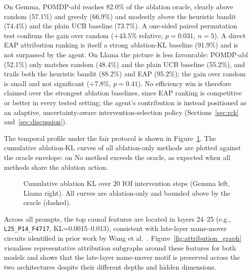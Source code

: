On Gemma, POMDP-abl reaches 82.0\% of the ablation oracle, clearly
above random (57.1\%) and greedy (66.9\%) and modestly above the
heuristic bandit (74.4\%) and the plain UCB baseline (73.7\%).  A
one-sided paired permutation test confirms the
gain over random ($+43.5\%$ relative, $p=0.031$, $n=5$).  A
direct EAP attribution ranking is itself a strong ablation-KL baseline
(91.9\%) and is not surpassed by the agent.  On Llama the
picture is less favourable: POMDP-abl (52.1\%) only matches random
(48.4\%) and the plain UCB baseline (55.2\%), and trails both the
heuristic bandit (88.2\%) and EAP (95.2\%); the
gain over random is small and not significant ($+7.8\%$, $p=0.41$).
No efficiency win is therefore claimed over the strongest
ablation baselines, since EAP ranking is competitive or better in every
tested setting; the agent's contribution is instead positioned as
an adaptive, uncertainty-aware intervention-selection policy
(Sections~\ref{sec:rck} and~\ref{sec:discussion}).

The temporal profile under the fair protocol is shown in
Figure~\ref{fig:cumkl}.  The cumulative ablation-KL curves of all
ablation-only methods are plotted against the oracle envelope: on
  No method exceeds the oracle, as
expected when all methods share the ablation action.

\begin{figure}[H]
\centering

\caption{Cumulative ablation KL over 20 IOI intervention steps
(Gemma left, Llama right). All curves are ablation-only and bounded
above by the oracle (dashed).}
\label{fig:cumkl}
\end{figure}

Across all prompts, the top causal features are located in layers
24--25 (e.g., \texttt{L25\_P14\_F4717}, KL=0.0015--0.013),
consistent with late-layer name-mover circuits identified in prior
work by Wang et al.~\cite{Wang2022}.  Figure~\ref{fig:attribution_graph}
visualises representative attribution subgraphs around these features
for both models and shows that the late-layer name-mover motif is
preserved across the two architectures despite their different depths
and hidden dimensions.

